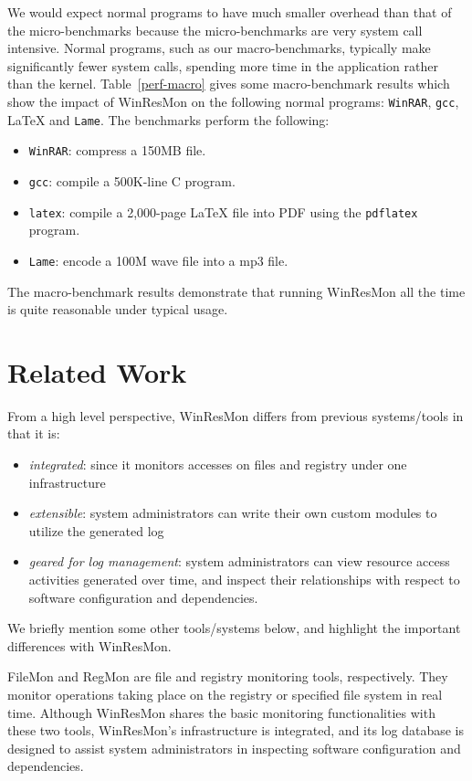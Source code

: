 We would expect normal programs to have much smaller overhead than that of the
micro-benchmarks because the micro-benchmarks are very system call intensive.
Normal programs, such as our macro-benchmarks, typically make significantly
fewer system calls, spending more time in the application rather than the
kernel.
Table~\ref{perf-macro} gives some macro-benchmark results which show the
impact of WinResMon on the following normal programs: {\small\tt WinRAR}, {\small\tt gcc}, \LaTeX{} and {\small\tt Lame}.
The benchmarks perform the following:
\begin{itemize}
\item {\small\tt WinRAR}: compress a 150MB file.  
\item {\small\tt gcc}: compile a 500K-line C program.  
\item {\small\tt latex}: compile a 2,000-page \LaTeX{} file into PDF using the
{\small\tt pdflatex} program.
\item {\small\tt Lame}: encode a 100M wave file into a mp3 file. 
\end{itemize}
The macro-benchmark results demonstrate that running WinResMon all the 
time  is quite reasonable under typical usage.


\section{Related Work}

 From a high level perspective, WinResMon differs from previous systems/tools in
that it is:

\begin{itemize}
\item {\em integrated}: since it monitors accesses on files and registry
under one infrastructure
\item {\em extensible}: system administrators can write their own custom
modules to utilize the generated log
\item {\em geared for log management}: system administrators can view
resource access activities generated over time, and inspect their relationships
with respect to software configuration and dependencies.
\end{itemize}

We briefly mention some other tools/systems below, and highlight the important
differences with WinResMon.

FileMon \cite{filemon} and RegMon \cite{regmon} are file and registry
monitoring tools, respectively.  They monitor operations taking place on
the registry or specified file system in real time.  Although WinResMon shares
the basic monitoring functionalities with these two tools, WinResMon's
infrastructure is integrated, and its log database is designed to assist
system administrators in inspecting software configuration and dependencies.

